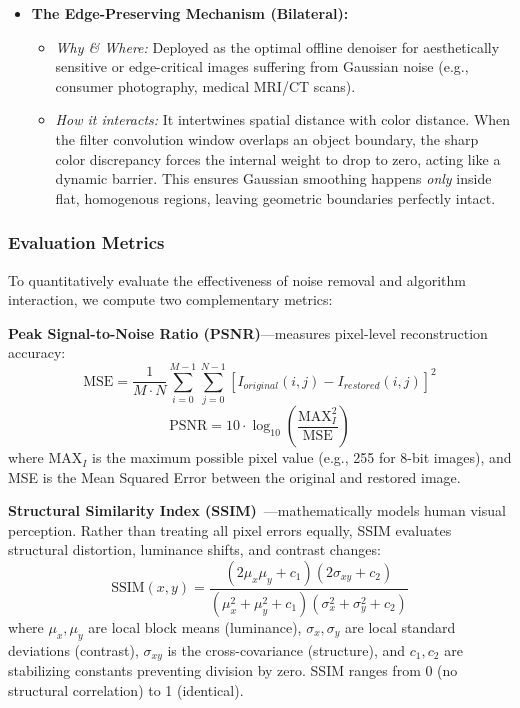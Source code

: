 \documentclass[a4paper,12pt]{article}
\begin{document}
\begin{itemize}
    \item \textbf{The Edge-Preserving Mechanism (Bilateral):}
    \begin{itemize}
        \item \textit{Why \& Where:} Deployed as the optimal offline denoiser for aesthetically sensitive or edge-critical images suffering from Gaussian noise (e.g., consumer photography, medical MRI/CT scans).
        \item \textit{How it interacts:} It intertwines spatial distance with color distance. When the filter convolution window overlaps an object boundary, the sharp color discrepancy forces the internal weight to drop to zero, acting like a dynamic barrier. This ensures Gaussian smoothing happens \textit{only} inside flat, homogenous regions, leaving geometric boundaries perfectly intact.
    \end{itemize}
\end{itemize}

\subsubsection{Evaluation Metrics}

To quantitatively evaluate the effectiveness of noise removal and algorithm interaction, we compute two complementary metrics:

\textbf{Peak Signal-to-Noise Ratio (PSNR)}---measures pixel-level reconstruction accuracy:
\begin{equation}
    \text{MSE} = \frac{1}{M \cdot N} \sum_{i=0}^{M-1} \sum_{j=0}^{N-1} [I_{original}(i,j) - I_{restored}(i,j)]^2
\end{equation}
\begin{equation}
    \text{PSNR} = 10 \cdot \log_{10} \left( \frac{\text{MAX}_I^2}{\text{MSE}} \right)
\end{equation}
where $\text{MAX}_I$ is the maximum possible pixel value (e.g., 255 for 8-bit images), and MSE is the Mean Squared Error between the original and restored image.

\textbf{Structural Similarity Index (SSIM)}~\cite{wang2004image}---mathematically models human visual perception. Rather than treating all pixel errors equally, SSIM evaluates structural distortion, luminance shifts, and contrast changes:
\begin{equation}
    \text{SSIM}(x,y) = \frac{(2\mu_x\mu_y + c_1)(2\sigma_{xy} + c_2)}{(\mu_x^2 + \mu_y^2 + c_1)(\sigma_x^2 + \sigma_y^2 + c_2)}
\end{equation}
where $\mu_x, \mu_y$ are local block means (luminance), $\sigma_x, \sigma_y$ are local standard deviations (contrast), $\sigma_{xy}$ is the cross-covariance (structure), and $c_1, c_2$ are stabilizing constants preventing division by zero. SSIM ranges from 0 (no structural correlation) to 1 (identical).
\end{document}
